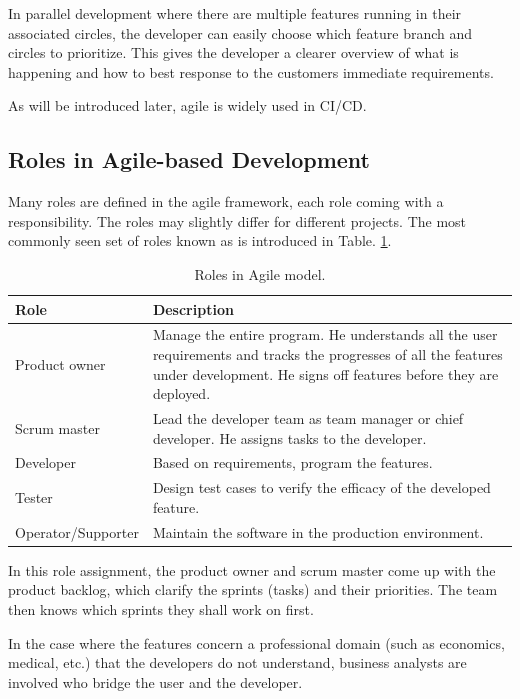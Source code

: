 In parallel development where there are multiple features running in their associated circles, the developer can easily choose which feature branch and circles to prioritize. This gives the developer a clearer overview of what is happening and how to best response to the customers immediate requirements.

As will be introduced later, agile is widely used in CI/CD.

\subsection{Roles in Agile-based Development}

Many roles are defined in the agile framework, each role coming with a responsibility. The roles may slightly differ for different projects. The most commonly seen set of roles known as  is introduced in Table. \ref{ch:cicd:tab:agilerole}.
\begin{table}[!htb]
	\centering
	\caption{Roles in Agile model.} \label{ch:cicd:tab:agilerole}
	\begin{tabularx}{\textwidth}{lX}
		\hline
		Role & Description \\
		\hline
		Product owner & Manage the entire program. He understands all the user requirements and tracks the progresses of all the features under development. He signs off features before they are deployed. \\ \hdashline
		Scrum master & Lead the developer team as team manager or chief developer. He assigns tasks to the developer. \\ \hdashline
		Developer & Based on requirements, program the features. \\ \hdashline
		Tester & Design test cases to verify the efficacy of the developed feature. \\ \hdashline
		Operator/Supporter & Maintain the software in the production environment. \\
		\hline
	\end{tabularx}
\end{table}

In this role assignment, the product owner and scrum master come up with the product backlog, which clarify the sprints (tasks) and their priorities. The team then knows which sprints they shall work on first.

In the case where the features concern a professional domain (such as economics, medical, etc.) that the developers do not understand, business analysts are involved who bridge the user and the developer.

